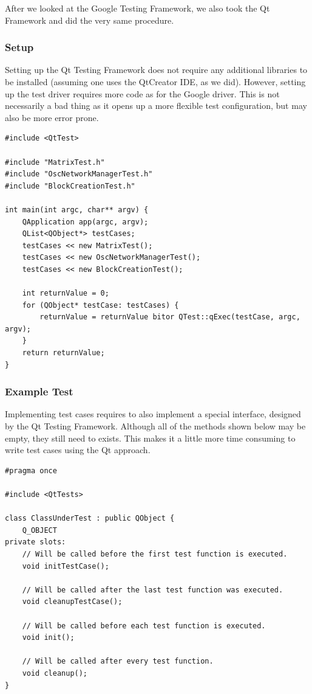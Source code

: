 \documentclass{scrreprt}
\begin{document}
After we looked at the Google Testing Framework, we also took the Qt Framework and did the very same procedure.

\subsubsection{Setup}

Setting up the Qt Testing Framework does not require any additional libraries to be installed (assuming one uses the QtCreator IDE, as we did). However, setting up the test driver requires more code as for the Google driver. This is not necessarily a bad thing as it opens up a more flexible test configuration, but may also be more error prone.

\bigskip
\begin{lstlisting}[title=tests-qt/main.cpp]
#include <QtTest>

#include "MatrixTest.h"
#include "OscNetworkManagerTest.h"
#include "BlockCreationTest.h"

int main(int argc, char** argv) {
	QApplication app(argc, argv);	
	QList<QObject*> testCases;
	testCases << new MatrixTest();
	testCases << new OscNetworkManagerTest();
	testCases << new BlockCreationTest();
	
	int returnValue = 0;
	for (QObject* testCase: testCases) {
		returnValue = returnValue bitor QTest::qExec(testCase, argc, argv);
	}
	return returnValue;
}
\end{lstlisting}
\bigskip

\subsubsection{Example Test}

Implementing test cases requires to also implement a special interface, designed by the Qt Testing Framework. Although all of the methods shown below may be empty, they still need to exists. This makes it a little more time consuming to write test cases using the Qt approach.

\bigskip
\begin{lstlisting}[title=tests-qt/ClassUnderTest.h]
#pragma once

#include <QtTests>

class ClassUnderTest : public QObject {
	Q_OBJECT
private slots:
	// Will be called before the first test function is executed.
	void initTestCase();
	
	// Will be called after the last test function was executed.
	void cleanupTestCase();
	
	// Will be called before each test function is executed.
	void init();
	
	// Will be called after every test function.
	void cleanup();
}
\end{lstlisting}
\bigskip
\end{document}

